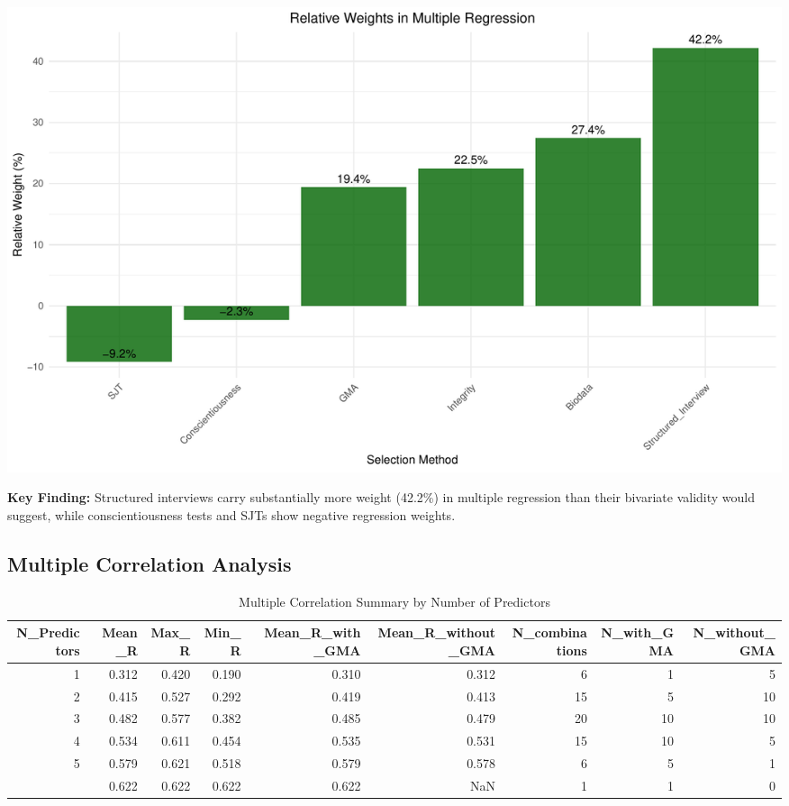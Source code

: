 \documentclass[
]{article}
\begin{document}
\begin{center}\includegraphics{berry_2024_reproducibility_report_files/figure-latex/dominance-analysis-1} \end{center}

\textbf{Key Finding:} Structured interviews carry substantially more
weight (42.2\%) in multiple regression than their bivariate validity
would suggest, while conscientiousness tests and SJTs show negative
regression weights.

\subsection{Multiple Correlation
Analysis}\label{multiple-correlation-analysis-1}

\begingroup\fontsize{12}{14}\selectfont

\begin{longtable}[t]{rrrrrrrrr}
\caption{\label{tab:multiple-correlations}Multiple Correlation Summary by Number of Predictors}\\
\toprule
N\_Predictors & Mean\_R & Max\_R & Min\_R & Mean\_R\_with\_GMA & Mean\_R\_without\_GMA & N\_combinations & N\_with\_GMA & N\_without\_GMA\\
\midrule
1 & 0.312 & 0.420 & 0.190 & 0.310 & 0.312 & 6 & 1 & 5\\
2 & 0.415 & 0.527 & 0.292 & 0.419 & 0.413 & 15 & 5 & 10\\
3 & 0.482 & 0.577 & 0.382 & 0.485 & 0.479 & 20 & 10 & 10\\
4 & 0.534 & 0.611 & 0.454 & 0.535 & 0.531 & 15 & 10 & 5\\
5 & 0.579 & 0.621 & 0.518 & 0.579 & 0.578 & 6 & 5 & 1\\
\addlinespace
6 & 0.622 & 0.622 & 0.622 & 0.622 & NaN & 1 & 1 & 0\\
\bottomrule
\end{longtable}
\endgroup{}
\end{document}
